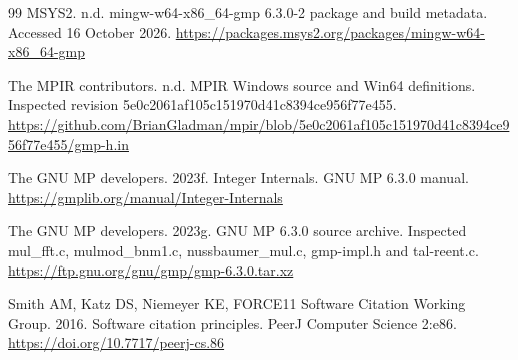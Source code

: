 \documentclass[11pt,a4paper]{article}
\begin{document}
\begin{thebibliography}{99}
 MSYS2. n.d. mingw-w64-x86\_\allowbreak{}64-gmp 6.3.0-2 package and build metadata. Accessed 16 October 2026. \url{https://packages.msys2.org/packages/mingw-w64-x86_64-gmp}

 The MPIR contributors. n.d. MPIR Windows source and Win64 definitions. Inspected revision 5e0c2061af105c151970d41c8394ce956f77e455. \url{https://github.com/BrianGladman/mpir/blob/5e0c2061af105c151970d41c8394ce956f77e455/gmp-h.in}

 The GNU MP developers. 2023f. Integer Internals. GNU MP 6.3.0 manual. \url{https://gmplib.org/manual/Integer-Internals}

 The GNU MP developers. 2023g. GNU MP 6.3.0 source archive. Inspected mul\_\allowbreak{}fft.c, mulmod\_\allowbreak{}bnm1.c, nussbaumer\_\allowbreak{}mul.c, gmp-impl.h and tal-reent.c. \url{https://ftp.gnu.org/gnu/gmp/gmp-6.3.0.tar.xz}

 Smith AM, Katz DS, Niemeyer KE, FORCE11 Software Citation Working Group. 2016. Software citation principles. PeerJ Computer Science 2:e86. \url{https://doi.org/10.7717/peerj-cs.86}

\end{thebibliography}
\end{document}
